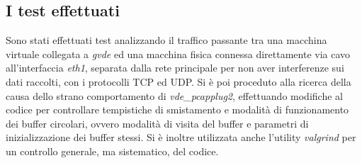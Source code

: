 \subsection{I test effettuati}
Sono stati effettuati test analizzando il traffico passante tra una macchina virtuale collegata a {\em gvde} ed una macchina fisica connessa direttamente via cavo all'interfaccia {\em eth1}, separata dalla rete principale per non aver interferenze sui dati raccolti, con i protocolli TCP ed UDP. Si è poi proceduto alla ricerca della causa dello strano comportamento di {\em vde\_pcapplug2}, effettuando modifiche al codice per controllare tempistiche di smistamento e modalità di funzionamento dei buffer circolari, ovvero modalità di visita del buffer e parametri di inizializzazione dei buffer stessi. Si è inoltre utilizzata anche l'utility {\em valgrind} per un controllo generale, ma sistematico, del codice.
